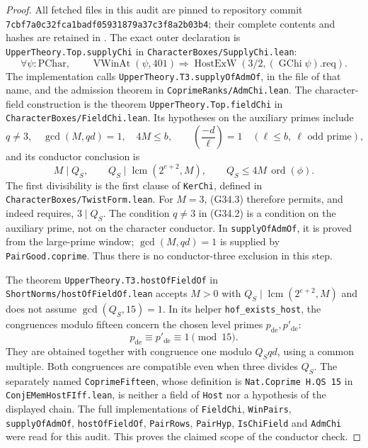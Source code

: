 \begin{proof}
All fetched files in this audit are pinned to repository commit
\texttt{7cbf7a0c32fca1badf05931879a37c3f8a2b03b4}; their complete
contents and hashes are retained in
.
The exact outer declaration is
\texttt{UpperTheory.Top.supplyChi} in
\texttt{CharacterBoxes/SupplyChi.lean}:
\[
 \forall\psi:\mathrm{PChar},\qquad
 \operatorname{VWinAt}(\psi,401)
       \Longrightarrow
 \operatorname{HostExW}(3/2,(\operatorname{GChi}\psi).\mathrm{req}).
                                                        \tag{G34.1}
\]
The implementation calls
\texttt{UpperTheory.T3.supplyOfAdmOf}, in the file of that name,
and the admission theorem in
\texttt{CoprimeRanks/AdmChi.lean}.
The character-field construction is the theorem
\texttt{UpperTheory.Top.fieldChi} in
\texttt{CharacterBoxes/FieldChi.lean}.
Its hypotheses on the auxiliary primes include
\[
 q\ne3,\quad \gcd(M,qd)=1,\quad 4M\le b,
 \qquad
 \left(\frac{-d}{\ell}\right)=1
 \quad(\ell\le b,\ \ell\text{ odd prime}),             \tag{G34.2}
\]
and its conductor conclusion is
\[
 M\mid Q_S,\qquad
 Q_S\mid\operatorname{lcm}(2^{e+2},M),\qquad
 Q_S\le4M\,\operatorname{ord}(\phi).                   \tag{G34.3}
\]
The first divisibility is the first clause of
\texttt{KerChi}, defined in \texttt{CharacterBoxes/TwistForm.lean}.
For $M=3$, (G34.3) therefore permits, and indeed requires,
$3\mid Q_S$.  The condition $q\ne3$ in (G34.2) is a condition
on the auxiliary prime, not on the character conductor.
In \texttt{supplyOfAdmOf}, it is proved from the large-prime window;
$\gcd(M,qd)=1$ is supplied by \texttt{PairGood.coprime}.
Thus there is no conductor-three exclusion in this step.

The theorem \texttt{UpperTheory.T3.hostOfFieldOf} in
\texttt{ShortNorms/hostOfFieldOf.lean} accepts $M>0$ with
$Q_S\mid\operatorname{lcm}(2^{e+2},M)$ and does not assume
$\gcd(Q_S,15)=1$.  In its helper \texttt{hof\_exists\_host},
the congruences modulo fifteen concern the chosen level
primes $p_{\mathrm{de}},p'_{\mathrm{de}}$:
\[
 p_{\mathrm{de}}\equiv p'_{\mathrm{de}}\equiv1\pmod{15}.
\]
They are obtained together with congruence one modulo
$Q_Sqd$, using a common multiple.  Both congruences are
compatible even when three divides $Q_S$.
The separately named \texttt{CoprimeFifteen}, whose definition
is \texttt{Nat.Coprime H.QS 15} in
\texttt{ConjEMemHostFIff.lean}, is neither a field of
\texttt{Host} nor a hypothesis of the displayed chain.
The full implementations of \texttt{FieldChi},
\texttt{WinPairs}, \texttt{supplyOfAdmOf},
\texttt{hostOfFieldOf}, \texttt{PairRows}, \texttt{PairHyp},
\texttt{IsChiField} and \texttt{AdmChi} were read for this audit.
This proves the claimed scope of the conductor check.


\end{proof}
